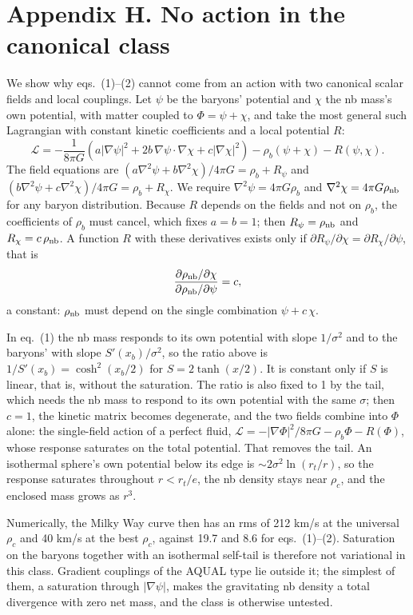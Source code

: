 \documentclass[
  10pt,
]{article}
\begin{document}
\section{Appendix H. No action in the canonical class}\label{appendix-h}

We show why eqs.~(1)--(2) cannot come from an action with two canonical scalar fields and local couplings. Let $\psi$ be the baryons' potential and $\chi$ the nb mass's own potential, with matter coupled to $\Phi=\psi+\chi$, and take the most general such Lagrangian with constant kinetic coefficients and a local potential $R$:
\[
\mathcal{L}=-\frac{1}{8\pi G}\left(a|\nabla\psi|^2+2b\,\nabla\psi\cdot\nabla\chi+c|\nabla\chi|^2\right)-\rho_b(\psi+\chi)-R(\psi,\chi).
\]
The field equations are $(a\nabla^2\psi+b\nabla^2\chi)/4\pi G=\rho_b+R_\psi$ and $(b\nabla^2\psi+c\nabla^2\chi)/4\pi G=\rho_b+R_\chi$. We require $\nabla^2\psi=4\pi G\rho_b$ and $\nabla^2\chi=4\pi G\rho_{\rm nb}$ for any baryon distribution. Because $R$ depends on the fields and not on $\rho_b$, the coefficients of $\rho_b$ must cancel, which fixes $a=b=1$; then $R_\psi=\rho_{\rm nb}$ and $R_\chi=c\,\rho_{\rm nb}$. A function $R$ with these derivatives exists only if $\partial R_\psi/\partial\chi=\partial R_\chi/\partial\psi$, that is
\[
\frac{\partial\rho_{\rm nb}/\partial\chi}{\partial\rho_{\rm nb}/\partial\psi}=c,
\]
a constant: $\rho_{\rm nb}$ must depend on the single combination $\psi+c\,\chi$.

In eq.~(1) the nb mass responds to its own potential with slope $1/\sigma^2$ and to the baryons' with slope $S'(x_b)/\sigma^2$, so the ratio above is $1/S'(x_b)=\cosh^2(x_b/2)$ for $S=2\tanh(x/2)$. It is constant only if $S$ is linear, that is, without the saturation. The ratio is also fixed to 1 by the tail, which needs the nb mass to respond to its own potential with the same $\sigma$; then $c=1$, the kinetic matrix becomes degenerate, and the two fields combine into $\Phi$ alone: the single-field action of a perfect fluid, $\mathcal{L}=-|\nabla\Phi|^2/8\pi G-\rho_b\Phi-R(\Phi)$, whose response saturates on the total potential. That removes the tail. An isothermal sphere's own potential below its edge is $\sim2\sigma^2\ln(r_t/r)$, so the response saturates throughout $r<r_t/e$, the nb density stays near $\rho_c$, and the enclosed mass grows as $r^3$.

Numerically, the Milky Way curve then has an rms of 212 km/s at the universal $\rho_c$ and 40 km/s at the best $\rho_c$, against 19.7 and 8.6 for eqs.~(1)--(2). Saturation on the baryons together with an isothermal self-tail is therefore not variational in this class. Gradient couplings of the AQUAL type lie outside it; the simplest of them, a saturation through $|\nabla\psi|$, makes the gravitating nb density a total divergence with zero net mass, and the class is otherwise untested.
\end{document}
